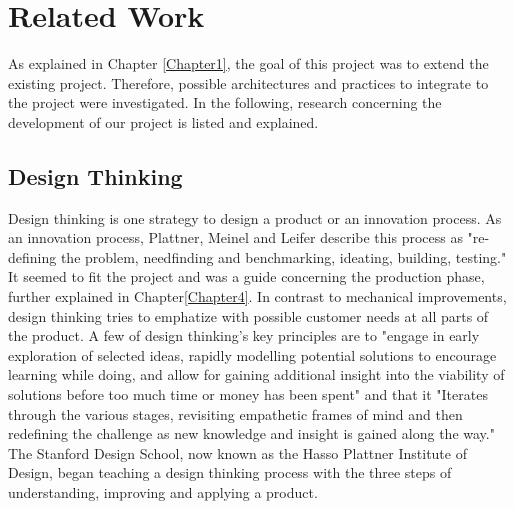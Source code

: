 
\chapter{Related Work} %

\label{Chapter2} %

As explained in Chapter \ref{Chapter1}, the goal of this project was to extend the existing project.
Therefore, possible architectures and practices to integrate to the project were investigated.
In the following, research concerning the development of our project is listed and explained.

\section{Design Thinking}
Design thinking is one strategy to design a product or an innovation process.
As an innovation process, Plattner, Meinel and Leifer describe this process as "re-defining the problem, needfinding and benchmarking, ideating, building, testing." \parencite{designThinkingBook}
It seemed to fit the project and was a guide concerning the production phase, further explained in Chapter\ref{Chapter4}.
In contrast to mechanical improvements, design thinking tries to emphatize with possible customer needs at all parts of the product.
A few of design thinking's key principles are to 
"engage in early exploration of selected ideas, rapidly modelling potential solutions to encourage learning 
while doing, and allow for gaining additional insight into the viability of 
solutions before too much time or money has been spent" and that it 
"Iterates through the various stages, revisiting empathetic frames of mind and then redefining the challenge as new knowledge and insight is gained along the way." 
\parencite{designThinking}
The Stanford Design School, now known as the Hasso Plattner Institute of Design, began teaching a design thinking process 
with the three steps of understanding, improving and applying a product. 

